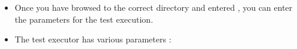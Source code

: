 
\begin{itemize}
\item Once you have browsed to the  correct directory and entered , you can enter the parameters for the test execution.
\item The test executor has various parameters :
\end{itemize}

\clearpage

